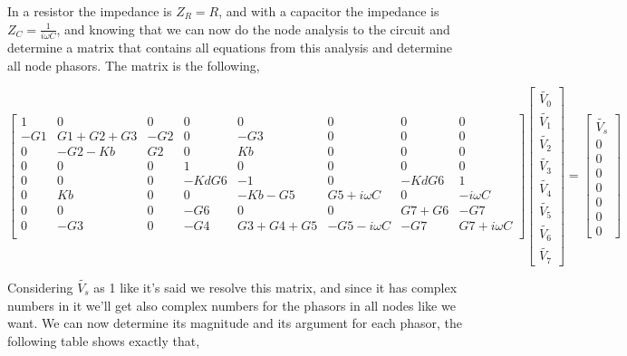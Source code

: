\par In a resistor the impedance is $Z_R=R$, and with a capacitor the impedance is $Z_C=\frac{1}{i\omega C}$, and knowing that we can now do the node analysis to the circuit and determine a matrix that contains all equations from this analysis and determine all node phasors. The matrix is the following,

$$
\begin{bmatrix}
1 & 0 & 0 & 0 & 0 & 0 & 0 & 0 \\
-G1 & G1+G2+G3 & -G2 & 0 & -G3 & 0 & 0 & 0 \\
0 & -G2-Kb & G2 & 0 & Kb & 0 & 0 & 0 \\
0 & 0 & 0 & 1 & 0 & 0 & 0 & 0 \\
0 & 0 & 0 & -KdG6 & -1 & 0 & -KdG6 & 1 \\
0 & Kb & 0 & 0 & -Kb-G5 & G5+i\omega C & 0 & -i\omega C \\
0 & 0 & 0 & -G6 & 0 & 0 & G7+G6 & -G7 \\
0 & -G3 & 0 & -G4 & G3+G4+G5 & -G5-i\omega C & -G7 & G7+i\omega C \\
\end{bmatrix}
\begin{bmatrix}
\widetilde{V_0} \\
\widetilde{V_1} \\
\widetilde{V_2} \\
\widetilde{V_3} \\
\widetilde{V_4} \\
\widetilde{V_5} \\
\widetilde{V_6} \\
\widetilde{V_7}  
\end{bmatrix}
=
\begin{bmatrix}
\widetilde{V_s} \\
0 \\
0 \\
0 \\
0 \\
0 \\
0 \\
0  
\end{bmatrix}
$$

\par Considering $\widetilde{V_s}$ as 1 like it's said we resolve this matrix, and since it has complex numbers in it we'll get also complex numbers for the phasors in all nodes like we want. We can now determine its magnitude and its argument for each phasor, the following table shows exactly that,

\vspace{5mm}

